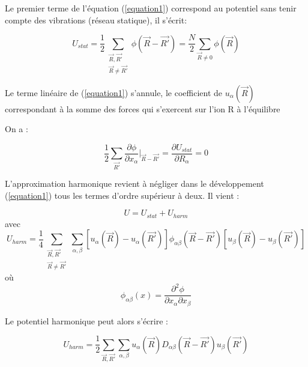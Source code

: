 Le premier terme de l'équation (\ref{equation1}) correspond au potentiel sans tenir compte des vibrations (réseau statique), il s'écrit:

\begin{equation}
U_{stat} = \frac{1}{2} \sum_{\substack{\overrightarrow{R},\overrightarrow{R'}\\ \overrightarrow{R}\neq \overrightarrow{R'}}} \phi(\overrightarrow{R}-\overrightarrow{R'}) = \frac{N}{2} \sum_{\overrightarrow{R}\neq0} \phi(\overrightarrow{R})
\end{equation}

Le terme linéaire de (\ref{equation1}) s'annule, le coefficient de $u_{\alpha}(\overrightarrow{R})$ correspondant à la somme des forces qui s'exercent sur l'ion R à l'équilibre

On a : 

\begin{equation}
\frac{1}{2} \sum_{\overrightarrow{R'}} \frac{\partial\phi}{\partial x_{\alpha}}\Big|_{\overrightarrow{R}-\overrightarrow{R'}} = \frac{\partial U_{stat}}{\partial R_{\alpha}} = 0
\end{equation}

L'approximation harmonique revient à négliger dans le développement (\ref{equation1}) tous les termes d'ordre supérieur à deux. Il vient :

\begin{equation}
U = U_{stat} + U_{harm}
\end{equation}
avec
\begin{equation}
U_{harm} = \frac{1}{4} \sum_{\substack{\overrightarrow{R},\overrightarrow{R'}\\ \overrightarrow{R}\neq \overrightarrow{R'}}} \sum_{\alpha,\beta}[u_{\alpha}(\overrightarrow{R})-u_{\alpha}(\overrightarrow{R'})] \phi_{\alpha\beta} (\overrightarrow{R}-\overrightarrow{R'})[u_{\beta}(\overrightarrow{R})-u_{\beta}(\overrightarrow{R'})] \label{equation2}
\end{equation}
où  \begin{equation}
\phi_{\alpha\beta}(x) = \frac{\partial^{2}\phi}{\partial x_{\alpha}\partial x_{\beta}}
\end{equation}

Le potentiel harmonique peut alors s'écrire :

\begin{equation}
U_{harm}= \frac{1}{2} \sum_{\overrightarrow{R},\overrightarrow{R'}} \sum_{\alpha,\beta} u_{\alpha} (\overrightarrow{R})D_{\alpha\beta}(\overrightarrow{R}-\overrightarrow{R'})u_{\beta}(\overrightarrow{R'}) \label{equation3}
\end{equation}

